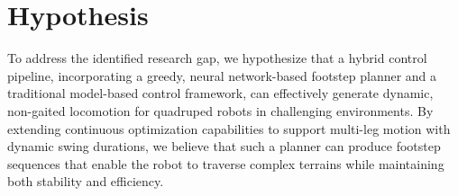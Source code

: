 \section{Hypothesis}
\label{sec:introduction-hypothesis}

To address the identified research gap, we hypothesize that a hybrid
control pipeline, incorporating a greedy, neural network-based
footstep planner and a traditional model-based control framework, can
effectively generate dynamic, non-gaited locomotion for quadruped
robots in challenging environments. By extending continuous optimization
capabilities to support multi-leg motion with dynamic swing durations,
we believe that such a planner can produce footstep sequences that
enable the robot to traverse complex terrains while maintaining both
stability and efficiency.
